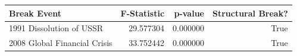 \begin{tabular}{lrrr}
\toprule
Break Event & F-Statistic & p-value & Structural Break? \\
\midrule
1991 Dissolution of USSR & 29.577304 & 0.000000 & True \\
2008 Global Financial Crisis & 33.752442 & 0.000000 & True \\
\bottomrule
\end{tabular}
